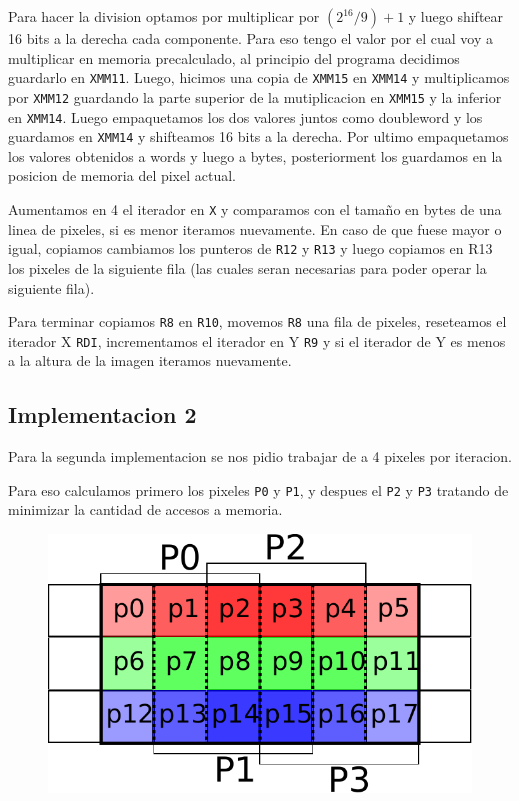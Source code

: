 Para hacer la division optamos por multiplicar por $(2^{16} / 9) + 1$ y luego shiftear 16 bits a la derecha cada componente. Para eso tengo el valor por el cual voy a multiplicar en memoria precalculado, al principio del programa decidimos guardarlo en \texttt{XMM11}.
Luego, hicimos una copia de \texttt{XMM15} en \texttt{XMM14} y multiplicamos por \texttt{XMM12} guardando la parte superior de la mutiplicacion en \texttt{XMM15} y la inferior en \texttt{XMM14}. Luego empaquetamos los dos valores juntos como doubleword y los guardamos en \texttt{XMM14} y shifteamos 16 bits a la derecha.
Por ultimo empaquetamos los valores obtenidos a words y luego a bytes, posteriorment los guardamos en la posicion de memoria del pixel actual.

Aumentamos en 4 el iterador en \texttt{X} y comparamos con el tamaño en bytes de una linea de pixeles, si es menor iteramos nuevamente. En caso de que fuese mayor o igual, copiamos cambiamos los punteros de \texttt{R12} y \texttt{R13} y luego copiamos en R13 los pixeles de la siguiente fila (las cuales seran necesarias para poder operar la siguiente fila).

Para terminar copiamos \texttt{R8} en \texttt{R10}, movemos \texttt{R8} una fila de pixeles, reseteamos el iterador X \texttt{RDI}, incrementamos el iterador en Y \texttt{R9} y si el iterador de Y es menos a la altura de la imagen iteramos nuevamente.

\subsection{Implementacion 2}
Para la segunda implementacion se nos pidio trabajar de a 4 pixeles por iteracion.

Para eso calculamos primero los pixeles \texttt{P0} y \texttt{P1}, y despues el \texttt{P2} y \texttt{P3} tratando de minimizar la cantidad de accesos a memoria. \\

\begin{figure}[h!]
	\centering
	\includegraphics[scale=0.5]{images/BlurASM2_1}
\end{figure}

